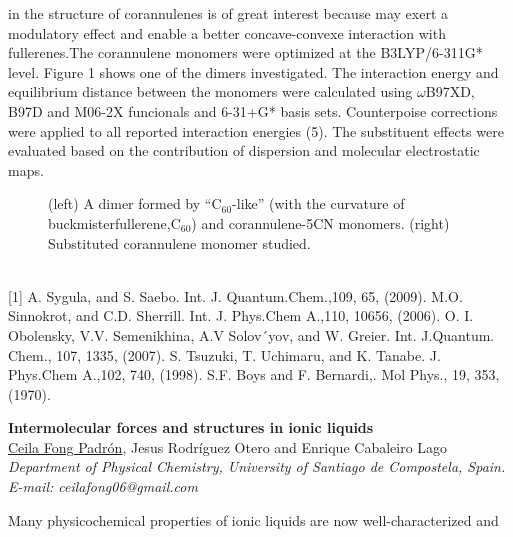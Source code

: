 in the structure of corannulenes is of great interest because may exert a modulatory
effect and enable a better concave-convexe interaction with fullerenes.The corannulene
monomers were optimized at the B3LYP/6-311G* level. Figure 1 shows one of the
dimers investigated. The interaction energy and equilibrium distance between the
monomers were calculated using $\omega$B97XD, B97D and M06-2X funcionals and 6-31+G*
basis sets. Counterpoise corrections were applied to all reported interaction energies (5).
The substituent effects were evaluated based on the contribution of dispersion and
molecular electrostatic maps.
\\
\begin{figure}[h]
 \centerline{}
 \caption[]{(left) A dimer formed by “C$_{60}$-like” (with the curvature of buckmisterfullerene,C$_{60}$) and corannulene-5CN monomers. (right) Substituted corannulene monomer studied.  }\label{figure 1}
\end{figure}
\\
{\footnotesize
[1] A. Sygula, and S. Saebo. Int. J. Quantum.Chem.,109, 65, (2009).
\newline
[2] M.O. Sinnokrot, and C.D. Sherrill. Int. J. Phys.Chem A.,110, 10656, (2006).
\newline
[3] O. I. Obolensky, V.V. Semenikhina, A.V Solov´yov, and W. Greier. Int. J.Quantum. Chem., 107, 1335, (2007).
\newline
[4] S. Tsuzuki, T. Uchimaru, and K. Tanabe. J. Phys.Chem A.,102, 740, (1998).
\newline
[5] S.F. Boys and F. Bernardi,. Mol Phys., 19, 353, (1970).
}
\newpage
\setcounter{figure}{0}
\begin{center}
{\bf \Large
Intermolecular forces and structures in ionic liquids
}
\\
\vspace{0.5cm}
\underline{Ceila Fong Padrón}, Jesus Rodríguez Otero and Enrique Cabaleiro Lago
\\
\vspace{0.5cm}
{\it
  Department of Physical Chemistry, University of Santiago de Compostela, Spain.
}
\\
\vspace{0.5cm}
{\it E-mail: ceilafong06@gmail.com }
\\
\vspace{0.5cm}
\end{center}
Many physicochemical properties of ionic liquids are now well-characterized and
